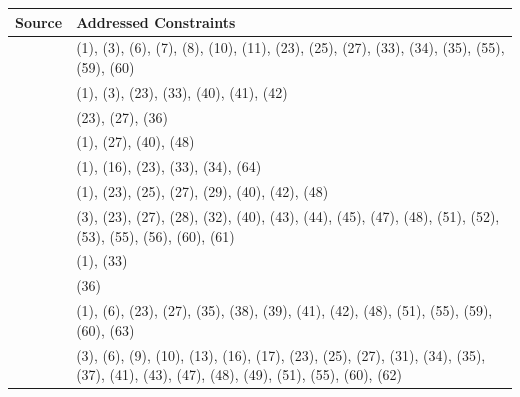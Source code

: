 \documentclass[10pt, a4paper]{article}
\begin{document}
\begin{table}[!ht]

\vspace{-1.4em}

\begin{center}
\setlength{\extrarowheight}{1pt}
\begin{tabularx}{\columnwidth}{|X|X|}

      \hline
      Source                                    & Addressed Constraints \\
      
      \hline
      \citet[chapter 6.2]{eisenberg_2013}       & (1), (3), (6), (7), (8), (10), (11), (23), (25), (27), (33), (34), (35), (55), (59), (60) \\

      \hline
      \citet{fuhrhop_kuerschner_2015}           & (1), (3), (23), (33), (40), (41), (42) \\

      \hline
      \citet{koliopoulou_2014}                  & (23), (27), (36) \\

      \hline
      \citet{kopf_2017}                         & (1), (27), (40), (48) \\

      \hline
      \citet{krott_etal_2007}                   & (1), (16), (23), (33), (34), (64) \\

      \hline
      \citet{kuerschner_2005}                   & (1), (23), (25), (27), (29), (40), (42), (48) \\

      \hline
      \citet{kuerschner_2010}                   & (3), (23), (27), (28), (32), (40), (43), (44), (45), (47), (48), (51), (52), (53), (55), (56), (60), (61) \\

      \hline
      \citet{libben_etal_2009}                  & (1), (33) \\

      \hline
      \citet{neef_borgwaldt_2012}               & (36) \\

      \hline
      \citet{nuebling_szczepaniak_2008}         & (1), (6), (23), (27), (35), (38), (39), (41), (42), (48), (51), (55), (59), (60), (63) \\
      
      \hline
      \citet{nuebling_szczepaniak_2013}         & (3), (6), (9), (10), (13), (16), (17), (23), (25), (27), (31), (34), (35), (37), (41), (43), (47), (48), (49), (51), (55), (60), (62) \\


\end{tabularx}
\end{center}
\end{table}
\end{document}

